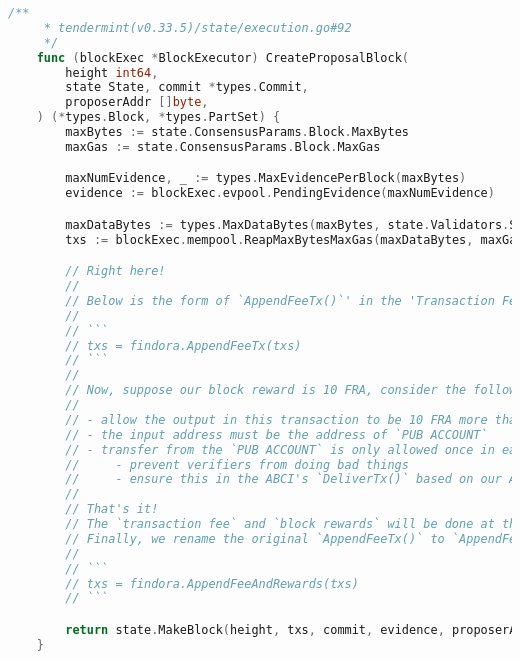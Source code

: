 \begin{lstlisting}[language=go]
    /**
     * tendermint(v0.33.5)/state/execution.go#92
     */
    func (blockExec *BlockExecutor) CreateProposalBlock(
        height int64,
        state State, commit *types.Commit,
        proposerAddr []byte,
    ) (*types.Block, *types.PartSet) {
        maxBytes := state.ConsensusParams.Block.MaxBytes
        maxGas := state.ConsensusParams.Block.MaxGas

        maxNumEvidence, _ := types.MaxEvidencePerBlock(maxBytes)
        evidence := blockExec.evpool.PendingEvidence(maxNumEvidence)

        maxDataBytes := types.MaxDataBytes(maxBytes, state.Validators.Size(), len(evidence))
        txs := blockExec.mempool.ReapMaxBytesMaxGas(maxDataBytes, maxGas)

        // Right here!
        //
        // Below is the form of `AppendFeeTx()`' in the 'Transaction Fee' section:
        //
        // ```
        // txs = findora.AppendFeeTx(txs)
        // ```
        //
        // Now, suppose our block reward is 10 FRA, consider the following rules:
        //
        // - allow the output in this transaction to be 10 FRA more than the input
        // - the input address must be the address of `PUB ACCOUNT`
        // - transfer from the `PUB ACCOUNT` is only allowed once in each block
        //     - prevent verifiers from doing bad things
        //     - ensure this in the ABCI's `DeliverTx()` based on our APP logic
        //
        // That's it!
        // The `transaction fee` and `block rewards` will be done at the same time.
        // Finally, we rename the original `AppendFeeTx()` to `AppendFeeAndRewards()`:
        //
        // ```
        // txs = findora.AppendFeeAndRewards(txs)
        // ```

        return state.MakeBlock(height, txs, commit, evidence, proposerAddr)
    }
\end{lstlisting}
